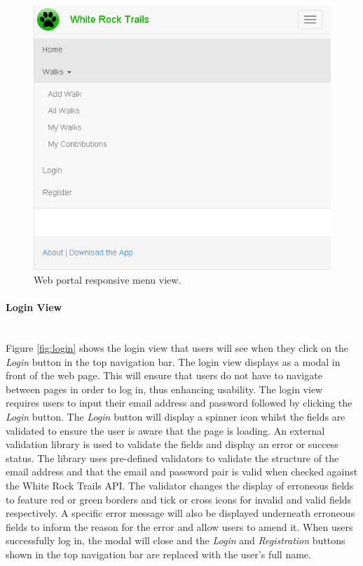 \documentclass[11pt,a4paper]{report}
\begin{document}
\begin{figure}[H]

\centering

\includegraphics[width=0.6\linewidth]{./img/webportal/home-responsive}

\caption{Web portal responsive menu view.}

\label{fig:home-responsive}

\end{figure}



\paragraph{Login View}\mbox{}\\
Figure \ref{fig:login} shows the login view that users will see when they click on the \emph{Login} button in the top navigation bar. The login view displays as a modal in front of the web page. This will ensure that users do not have to navigate between pages in order to log in, thus enhancing usability. The login view requires users to input their email address and password followed by clicking the \emph{Login} button. The \emph{Login} button will display a spinner icon whilst the fields are validated to ensure the user is aware that the page is loading. An external validation library is used to validate the fields and display an error or success status. The library uses pre-defined validators to validate the structure of the email address and that the email and password pair is valid when checked against the White Rock Trails API. The validator changes the display of erroneous fields to feature red or green borders and tick or cross icons for invalid and valid fields respectively. A specific error message will also be displayed underneath erroneous fields to inform the reason for the error and allow users to amend it. When users successfully log in, the modal will close and the \emph{Login} and \emph{Registration} buttons shown in the top navigation bar are replaced with the user's full name\cite{milestone2}.
\end{document}
